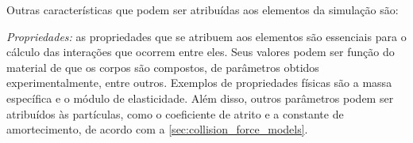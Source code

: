 Outras características que podem ser atribuídas aos elementos da simulação são:
\begin{alineas}
\item \textit{Propriedades:} as propriedades que se atribuem aos elementos são essenciais para o cálculo das interações que ocorrem entre eles. Seus valores podem ser função do material de que os corpos são compostos, de parâmetros obtidos experimentalmente, entre outros. Exemplos de propriedades físicas são a massa específica e o módulo de elasticidade. Além disso, outros parâmetros podem ser atribuídos às partículas, como o coeficiente de atrito e a constante de amortecimento, de acordo com a \cref{sec:collision_force_models}.



\end{alineas}
